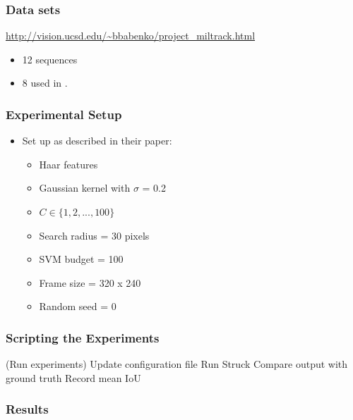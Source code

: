 
\begin{frame}
    \frametitle{Data sets}
    \url{http://vision.ucsd.edu/~bbabenko/project_miltrack.html}
    \begin{itemize}
        \item 12 sequences
        \item 8 used in \cite{6126251}.
    \end{itemize}
\end{frame}

\begin{frame}
    \frametitle{Experimental Setup}
    \begin{itemize}
        \item Set up as described in their paper:
            \begin{itemize}
                \item Haar features
                \item Gaussian kernel with \(\sigma\) = 0.2
                \item \(C \in \{1, 2, ..., 100\}\)
                \item Search radius = 30 pixels
                \item SVM budget = 100
                \item Frame size = 320 x 240
                \item Random seed = 0
            \end{itemize}
    \end{itemize}
\end{frame}

\begin{frame}
    \frametitle{Scripting the Experiments}
    \begin{algorithm}[H]
        \DontPrintSemicolon
        \Begin(Run experiments)
        {
            {
                {
                    Update configuration file\;
                    Run Struck\;
                    Compare output with ground truth\;
                    Record mean IoU\;
                }
            }
        }
    \end{algorithm}
\end{frame}

\begin{frame}
    \frametitle{Results}
    \begin{center}
        
    \end{center}
\end{frame}

